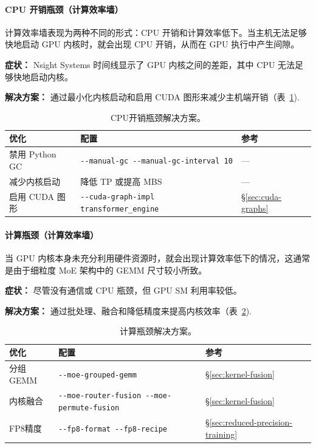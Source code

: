 \paragraph*{CPU 开销瓶颈（计算效率墙）}
计算效率墙表现为两种不同的形式：CPU 开销和计算效率低下。当主机无法足够快地启动 GPU 内核时，就会出现 CPU 开销，从而在 GPU 执行中产生间隙。

\noindent\textbf{症状：} Nsight Systems 时间线显示了 GPU 内核之间的差距，其中 CPU 无法足够快地启动内核。

\noindent\textbf{解决方案：} 通过最小化内核启动和启用 CUDA 图形来减少主机端开销（表~\ref{tab:cpu-bottleneck}).

\begin{table}[ht]
\centering
\caption{CPU开销瓶颈解决方案。}
\label{tab:cpu-bottleneck}
\begin{tabular}{lll}
\toprule
\textbf{优化} & \textbf{配置} & \textbf{参考} \\
\midrule
禁用 Python GC & \texttt{-{}-manual-gc -{}-manual-gc-interval 10} & --- \\
减少内核启动 & 降低 TP 或提高 MBS & --- \\
启用 CUDA 图形 & \texttt{-{}-cuda-graph-impl transformer\_engine} & \S\ref{sec:cuda-graphs} \\
\bottomrule
\end{tabular}
\end{table}

\paragraph*{计算瓶颈（计算效率墙）}
当 GPU 内核本身未充分利用硬件资源时，就会出现计算效率低下的情况，这通常是由于细粒度 MoE 架构中的 GEMM 尺寸较小所致。

\noindent\textbf{症状：} 尽管没有通信或 CPU 瓶颈，但 GPU SM 利用率较低。

\noindent\textbf{解决方案：} 通过批处理、融合和降低精度来提高内核效率（表~\ref{tab:compute-bottleneck}).

\begin{table}[ht]
\centering
\caption{计算瓶颈解决方案。}
\label{tab:compute-bottleneck}
\begin{tabular}{llp{4cm}}
\toprule
\textbf{优化} & \textbf{配置} & \textbf{参考} \\
\midrule
分组GEMM & \texttt{-{}-moe-grouped-gemm} & \S\ref{sec:kernel-fusion} \\
内核融合 & \texttt{-{}-moe-router-fusion -{}-moe-permute-fusion} & \S\ref{sec:kernel-fusion} \\
FP8精度 & \texttt{-{}-fp8-format -{}-fp8-recipe} & \S\ref{sec:reduced-precision-training} \\
\bottomrule
\end{tabular}
\end{table}

